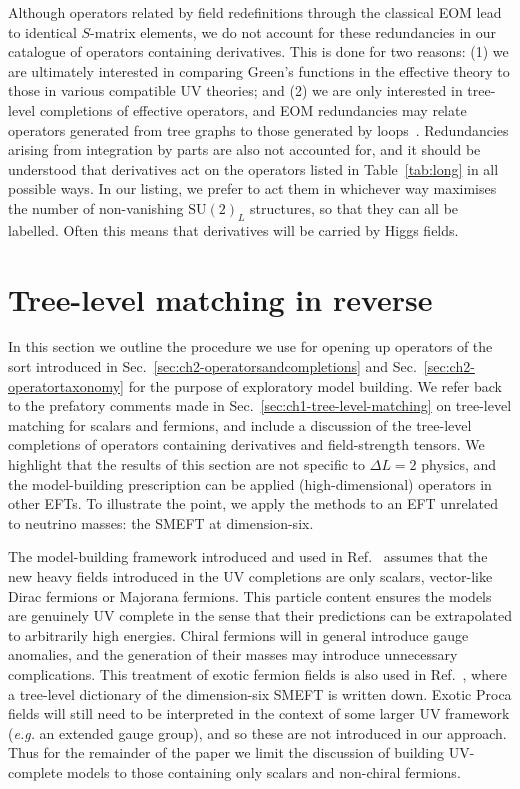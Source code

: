 Although operators related by field redefinitions through the classical EOM lead
to identical $S$-matrix elements, we do not account for these redundancies in
our catalogue of operators containing derivatives. This is done for two reasons:
(1) we are ultimately interested in comparing Green's functions in the effective
theory to those in various compatible UV theories; and (2) we are only
interested in tree-level completions of effective operators, and EOM
redundancies may relate operators generated from tree graphs to those generated
by loops~\cite{Arzt:1994gp, Einhorn:2013kja}. Redundancies arising from
integration by parts are also not accounted for, and it should be
understood that derivatives act on the operators listed in Table~\ref{tab:long}
in all possible ways. In our listing, we prefer to act them in whichever way
maximises the number of non-vanishing $\mathrm{SU}(2)_{L}$ structures, so that
they can all be labelled. Often this means that derivatives will be carried by
Higgs fields.

\section{Tree-level matching in reverse}
\label{sec:ch2-treelevelmatching}

In this section we outline the procedure we use for opening up operators of the
sort introduced in Sec.~\ref{sec:ch2-operatorsandcompletions} and
Sec.~\ref{sec:ch2-operatortaxonomy} for the purpose of exploratory model building.
We refer back to the prefatory comments made in
Sec.~\ref{sec:ch1-tree-level-matching} on tree-level matching for scalars and
fermions, and include a discussion of the tree-level completions of operators
containing derivatives and field-strength tensors. We highlight that the results
of this section are not specific to $\Delta L = 2$ physics, and the
model-building prescription can be applied (high-dimensional) operators in other
EFTs. To illustrate the point, we apply the methods to an EFT unrelated to
neutrino masses: the SMEFT at dimension-six.

The model-building framework introduced and used in Ref.~\cite{Angel:2012ug}
assumes that the new heavy fields introduced in the UV completions are only
scalars, vector-like Dirac fermions or Majorana fermions. This particle content
ensures the models are genuinely UV complete in the sense that their predictions
can be extrapolated to arbitrarily high energies. Chiral fermions will in
general introduce gauge anomalies, and the generation of their masses may
introduce unnecessary complications. This treatment of exotic fermion fields is
also used in Ref.~\cite{deBlas:2017xtg}, where a tree-level dictionary of the
dimension-six SMEFT is written down. Exotic Proca fields will still need to be
interpreted in the context of some larger UV framework (\textit{e.g.} an
extended gauge group), and so these are not introduced in our approach. Thus for
the remainder of the paper we limit the discussion of building UV-complete
models to those containing only scalars and non-chiral fermions.

